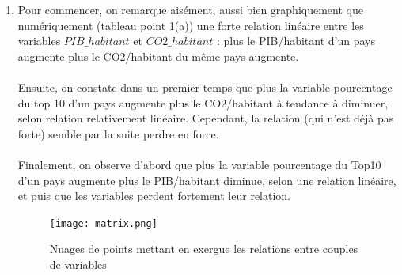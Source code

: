 \documentclass[a4paper, 11pt]{article}
\begin{document}
\begin{enumerate}[label=(\alph*)]
\begin{enumerate}[label=\roman*.]
\begin{figure}[h!]
\begin{minipage}{.5\textwidth}
    \end{minipage}
\end{figure}
    \end{enumerate}
    \newpage
    \item Pour commencer, on remarque aisément, aussi bien graphiquement que numériquement (tableau point 1(a)) une forte relation linéaire entre les variables $PIB\_habitant$ et $CO2\_habitant$ : plus le PIB/habitant d'un pays augmente plus le CO2/habitant du même pays augmente.
    \\
    \\
    Ensuite, on constate dans un premier temps que plus la variable pourcentage du top 10 d'un pays augmente plus le CO2/habitant à tendance à diminuer, selon relation relativement linéaire. Cependant, la relation (qui n'est déjà pas forte) semble par la suite perdre en force.
    \\
    \\
    Finalement, on observe d'abord que plus la variable pourcentage du Top10 d'un pays augmente plus le PIB/habitant diminue, selon une relation linéaire, et puis que les variables perdent fortement leur relation.
    
    \begin{figure}[h!]
        \centering
        \texttt{[image: matrix.png]}
        \caption{Nuages de points mettant en exergue les relations entre couples de variables}
        \label{fig:my_label}
    \end{figure}
\end{enumerate}

\newpage
\end{document}

